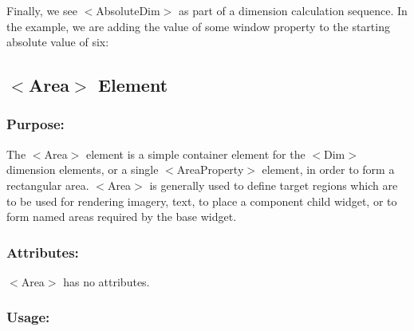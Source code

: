 Finally, we see {\ttfamily $<$Absolute\+Dim$>$} as part of a dimension calculation sequence. In the example, we are adding the value of some window property to the starting absolute value of six\+: 
\begin{DoxyCode}{0}
\end{DoxyCode}
\hypertarget{fal_element_ref_fal_elem_ref_sec_3}{}\subsection{$<$\+Area$>$ Element}\label{fal_element_ref_fal_elem_ref_sec_3}
\hypertarget{fal_element_ref_fal_elem_ref_sec_3_1}{}\subsubsection{Purpose\+:}\label{fal_element_ref_fal_elem_ref_sec_3_1}
The {\ttfamily $<$Area$>$} element is a simple container element for the {\ttfamily $<$Dim$>$} dimension elements, or a single {\ttfamily $<$Area\+Property$>$} element, in order to form a rectangular area. {\ttfamily $<$Area$>$} is generally used to define target regions which are to be used for rendering imagery, text, to place a component child widget, or to form \textquotesingle{}named\textquotesingle{} areas required by the base widget.\hypertarget{fal_element_ref_fal_elem_ref_sec_3_2}{}\subsubsection{Attributes\+:}\label{fal_element_ref_fal_elem_ref_sec_3_2}
{\ttfamily $<$Area$>$} has no attributes.\hypertarget{fal_element_ref_fal_elem_ref_sec_3_3}{}\subsubsection{Usage\+:}\label{fal_element_ref_fal_elem_ref_sec_3_3}


